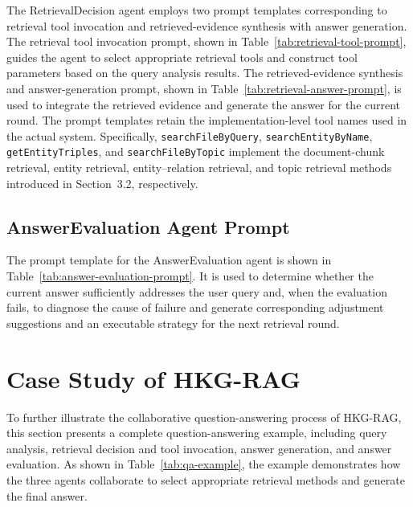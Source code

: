 \documentclass[preprint,12pt,authoryear]{elsarticle}
\begin{document}
The RetrievalDecision agent employs two prompt templates corresponding to retrieval tool invocation and retrieved-evidence synthesis with answer generation. The retrieval tool invocation prompt, shown in Table~\ref{tab:retrieval-tool-prompt}, guides the agent to select appropriate retrieval tools and construct tool parameters based on the query analysis results. The retrieved-evidence synthesis and answer-generation prompt, shown in Table~\ref{tab:retrieval-answer-prompt}, is used to integrate the retrieved evidence and generate the answer for the current round. The prompt templates retain the implementation-level tool names used in the actual system. Specifically, \texttt{searchFileByQuery}, \texttt{searchEntityByName}, \texttt{getEntityTriples}, and \texttt{searchFileByTopic} implement the document-chunk retrieval, entity retrieval, entity--relation retrieval, and topic retrieval methods introduced in Section~3.2, respectively.



\subsection{AnswerEvaluation Agent Prompt}
The prompt template for the AnswerEvaluation agent is shown in Table~\ref{tab:answer-evaluation-prompt}. It is used to determine whether the current answer sufficiently addresses the user query and, when the evaluation fails, to diagnose the cause of failure and generate corresponding adjustment suggestions and an executable strategy for the next retrieval round.

\section{Case Study of HKG-RAG}
\label{app:case-study}

To further illustrate the collaborative question-answering process of HKG-RAG, this section presents a complete question-answering example, including query analysis, retrieval decision and tool invocation, answer generation, and answer evaluation. As shown in Table~\ref{tab:qa-example}, the example demonstrates how the three agents collaborate to select appropriate retrieval methods and generate the final answer.






\end{document}
